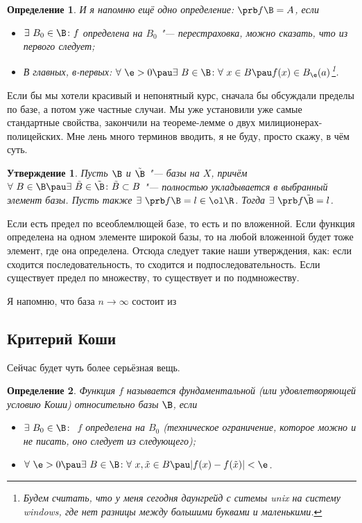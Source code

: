 \documentclass[a4paper,10pt,twoside]{article}
\newtheorem{Def}{Определение}[section]
\newtheorem{Ut}{Утверждение}[section]
\begin{document}
 \begin{Def}
 	И я напомню ещё одно определение: $\prb f\B=A$, если
 	\begin{itemize}
 	  \item [0)] $\exists\  B_0 \in\B\colon f$ определена на $B_0$ "--- перестраховка, можно сказать, что из первого следует;
 	  \item [1)] В главных, в-первых: $\forall\ \e>0\pau \exists\  B\in\B\colon \forall\  x\in B\pau f(x)\in B_\e(a)$\footnote{Будем считать, что
 	  у меня сегодня даунгрейд с ситемы unix на систему windows, где нет разницы между большими буквами и маленькими.}.
 	\end{itemize}
 \end{Def}
 
 Если бы мы хотели красивый и непонятный курс, сначала бы обсуждали пределы по базе, а потом уже частные случаи. Мы уже установили уже
 самые стандартные свойства, закончили на теореме-лемме о двух милиционерах-полицейских. Мне лень много терминов вводить, я не буду,
 просто скажу, в чём суть.
 
 \begin{Ut}
 Пусть $\B$ и $\tilde\B$ "--- базы на $X$, причём $\forall\  B\in\B\pau \exists\  \tilde B\in\tilde\B\colon \tilde B\subset B$ "--- полностью укладывается
 в выбранный элемент базы. Пусть также $\exists\  \prb f\B=l\in\ol\R$. Тогда $\exists\ \prb f{\tilde\B}=l$.   
 \end{Ut}
 
 Если есть предел по всеоблемлющей базе, то есть и по вложенной. Если функция определена на одном элементе широкой базы, то на любой вложенной будет тоже
 элемент, где она определена. Отсюда следует такие наши утверждения, как: если сходится последовательность, то сходится и подпоследовательность.
 Если существует предел по множеству, то существует и по подмножеству.
 
 Я напомню, что база $n\to\infty$ состоит из 
 
 \subsection{Критерий Коши}
 
 Сейчас будет чуть более серьёзная вещь. 
 
 \begin{Def}
 	Функция $f$ называется фундаментальной (или удовлетворяющей условию Коши) относительно базы $\B$, если
 	\begin{itemize}
 	  \item [0)] $\exists\  B_0\in\B\colon$ $f$ определена на $B_0$ (техническое ограничение, которое можно и не писать, оно следует из следующего);
 	  \item [1)] $\forall\ \e>0\pau \exists\  B\in\B\colon\forall\  x,\tilde x\in B\pau |f(x)-f(\tilde x)|<\e$.
 	\end{itemize}
 \end{Def}
 
\end{document}
